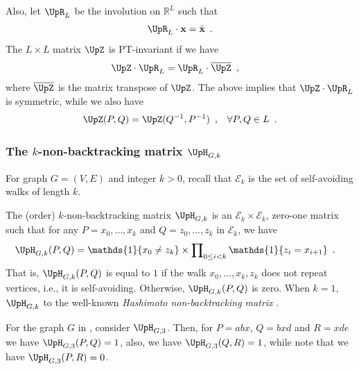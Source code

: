 \documentclass[11pt,reqno]{amsart}
\numberwithin{equation}{section}
\newcommand{\cE}{{\mathcal{E}}}
\newcommand{\amethyst}[1]{{\color{amethyst}#1} }
\newcommand{\blue}[1]{{\color{blue}#1}}
\newcommand{\bluepigment}[1]{{\color{blue(pigment)}#1}}
\newcommand{\byzantine}[1]{{\color{byzantine}#1}}
\newcommand{\bostonuniversityred}[1]{{\color{bostonuniversityred}#1}}
\newcommand{\capri}[1]{{\color{capri}#1}}
\newcommand{\cadmiumgreen}[1]{{\color{cadmiumgreen}#1}}
\newcommand{\deeppink}[1]{{\color{deeppink}#1}}
\newcommand{\electricviolet}[1]{{\color{electricviolet}#1}}
\newcommand{\goldenbrown}[1]{{\color{goldenbrown}#1}}
\newcommand{\heliotrope}[1]{{\color{heliotrope}#1}}
\newcommand{\iris}[1]{{\color{iris}#1}}
\newcommand{\red}[1]{{\color{red}#1}}
\newcommand{\Ind}{\mathds{1}}
\newcommand{\ExtV}{\iris{\cE}}
\newcommand{\PTV}[1]{\check{#1}}
\newcommand{\MTR}[1]{\overline{#1}}
\newcommand{\NBMatrix}{\cadmiumgreen{\UpH}_{G,\kk}}
\newcommand{\NBMatrixE}{\byzantine{\UpH}}
\newcommand{\Invol}{\UpR}
\renewcommand{\amethyst}[1]{#1}
\renewcommand{\blue}[1]{#1}
\renewcommand{\bluepigment}[1]{#1}
\renewcommand{\byzantine}[1]{#1}
\renewcommand{\bostonuniversityred}[1]{#1}
\renewcommand{\capri}[1]{#1}
\renewcommand{\cadmiumgreen}[1]{#1}
\renewcommand{\deeppink}[1]{#1}
\renewcommand{\electricviolet}[1]{#1}
\renewcommand{\goldenbrown}[1]{#1}
\renewcommand{\heliotrope}[1]{#1}
\renewcommand{\iris}[1]{#1}
\renewcommand{\red}[1]{#1}
\newcommand{\ka}{\electricviolet{a}}
\newcommand{\kb}{\deeppink{b}}
\newcommand{\kc}{\deeppink{c}}
\newcommand{\kd}{\goldenbrown{d}}
\newcommand{\ke}{\blue{e}}
\newcommand{\ki}{\capri{i}}
\newcommand{\kk}{\bluepigment{k}}
\newcommand{\kP}{\goldenbrown{P}}
\newcommand{\kQ}{\amethyst{Q}}
\newcommand{\kR}{\bostonuniversityred{R}}%
\newcommand{\kx}{\heliotrope{x}}
\newcommand{\kz}{\cadmiumgreen{z}}
\renewcommand{\ka}{a}
\renewcommand{\kb}{b}
\renewcommand{\kc}{x}
\renewcommand{\kd}{d}
\renewcommand{\ke}{e}
\renewcommand{\ki}{i}
\renewcommand{\kk}{k}
\renewcommand{\kP}{P}
\renewcommand{\kQ}{Q}
\renewcommand{\kR}{R}
\renewcommand{\kx}{x}
\renewcommand{\kz}{z}
\begin{document}
\noindent
Also, let $\Invol_L$ be the involution on $\mathbb{R}^{L}$ such that
\begin{align}\label{def:OfInvolutation}
\Invol_L \cdot {\bf \kx}=\PTV{\bf \kx} \enspace. 
\end{align}
The $L\times L$ matrix $\UpZ$ is PT-invariant if we have 
\begin{align}\label{eq:DefPTInvarianceFormal}
\UpZ\cdot \Invol_L &=\Invol_L \cdot \MTR{\UpZ}\enspace, 
\end{align}
where $\MTR{\UpZ}$ is the  matrix transpose of $\UpZ$. The above implies 
that $\UpZ\cdot \Invol_L$ is symmetric, while we also have
% 
% 
\begin{align}\label{def:PTInvariance}
\UpZ(\kP,\kQ) &=\UpZ(\kQ^{-1},\kP^{-1}) \enspace, & \forall \kP,\kQ \in L \enspace. 
\end{align}
% 



\subsubsection{The $\kk$-non-backtracking matrix $\NBMatrix$}
 For graph $G=(V,E)$ and integer $\kk>0$, recall that $\ExtV_{\kk}$ is the set of self-avoiding walks of length $\kk$. 
 
 
% 
 The (order) $\kk$-non-backtracking matrix $\NBMatrix$ is an $\ExtV_{\kk} \times \ExtV_{\kk}$, zero-one matrix 
 such that for any $\kP=\kx_0,\ldots, \kx_{\kk}$ and $\kQ=\kz_0, \ldots, \kz_{\kk}$ in $\ExtV_{\kk}$, we have 
\begin{align}\label{eq:DefOfKNBMatrix}
\NBMatrix(\kP, \kQ) &=\Ind\{\kx_0 \neq \kz_{\kk} \}\times \prod\nolimits_{0\leq \ki <\kk}\Ind\{\kz_{\ki} = \kx_{\ki+1}\} \enspace.
\end{align}
That is, $\NBMatrix(\kP, \kQ)$ is equal to $1$ if the walk $\kx_0, \ldots, \kx_{\kk}, \kz_{\kk}$  does not repeat vertices, i.e.,
it is self-avoiding. Otherwise, $\NBMatrix(\kP, \kQ)$ is zero. 
%
When $\kk=1$, $\NBMatrix$  to the well-known {\em Hashimoto non-backtracking matrix} \cite{Hash89}.


For the graph $G$ in , consider $\NBMatrixE_{G,3}$.
Then, for $\kP=\ka\kb\kc$, $\kQ=\kb\kc \kd$ and $\kR=\kc \kd \ke$ 
we have $\NBMatrixE_{G,3}(\kP, \kQ)=1$, also, we have $\NBMatrixE_{G,3}(\kQ,\kR)=1$, while note that we have 
$\NBMatrixE_{G,3}(\kP, \kR)=0$.
\end{document}
